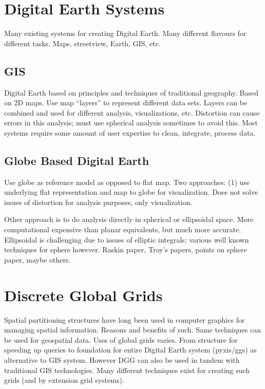 \section{Digital Earth Systems}
Many existing systems for creating Digital Earth.
Many different flavours for different tasks.
Maps, streetview, Earth, GIS, etc.
\cite{mahdavi2015survey}
\cite{alderson2020digital}


\subsection{GIS}
Digital Earth based on principles and techniques of traditional geography.
Based on 2D maps.
Use map ``layers'' to represent different data sets.
Layers can be combined and used for different analysis, visualizations, etc.
Distortion can cause errors in this analysis; must use spherical analysis sometimes to avoid this.
Most systems require some amount of user expertise to clean, integrate, process data.
\cite{foresman1998history}


\subsection{Globe Based Digital Earth}
Use globe as reference model as opposed to flat map.
Two approaches:
(1) use underlying flat representation and map to globe for visualization.
Does not solve issues of distortion for analysis purposes, only visualization.
\cite{goodchild2018reimagining}


Other approach is to do analysis directly in spherical or ellipsoidal space.
More computational expensive than planar equivalents, but much more accurate.
Ellipsoidal is challenging due to issues of elliptic integrals; various well known techniques for sphere however.
Raskin paper, Troy's papers, points on sphere paper, maybe others.
\cite{raskin1994spatial}
\cite{bahrdt2017rational}
\cite{alderson2016multiresolution}
\cite{alderson2019multiscale}
\cite{alderson2018offsetting}


\section{Discrete Global Grids}
Spatial partitioning structures have long been used in computer graphics for managing spatial information.
Reasons and benefits of such.
Same techniques can be used for geospatial data.
Uses of global grids varies.
From structure for speeding up queries to foundation for entire Digital Earth system (pyxis/ggs) as alternative to GIS system.
However DGG can also be used in tandem with traditional GIS technologies.
Many different techniques exist for creating such grids (and by extension grid systems).
\cite{sahr1998discrete}
\cite{sahr2003geodesic}


